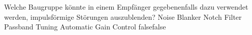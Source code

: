     {Welche Baugruppe könnte in einem Empfänger gegebenenfalls dazu verwendet werden, impulsförmige Störungen auszublenden?}
    {Noise Blanker}
    {Notch Filter}
    {Passband Tuning}
    {Automatic Gain Control}
    {false}{false}